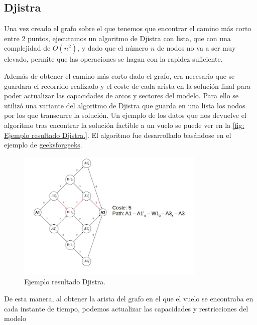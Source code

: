 \subsection{Djistra}
Una vez creado el grafo sobre el que tenemos que encontrar el camino más corto entre 2 puntos, ejecutamos un algoritmo de Djistra con lista, que con una complejidad de $O(n^{2})$, y dado que el número $n$ de nodos no va a ser muy elevado, permite que las operaciones se hagan con la rapidez suficiente.

Además de obtener el camino más corto dado el grafo, era necesario que se guardara el recorrido realizado y el coste de cada arista en la solución final para poder actualizar las capacidades de arcos y sectores del modelo. Para ello se utilizó una variante del algoritmo de Djistra que guarda en una lista los nodos por los que transcurre la solución. Un ejemplo de los datos que nos devuelve el algoritmo tras encontrar la solución factible a un vuelo se puede ver en la \autoref{fig: Ejemplo resultado Djistra.}. El algoritmo fue desarrollado basándose en el ejemplo de \href{http://www.geeksforgeeks.org/printing-paths-dijkstras-shortest-path-algorithm/}{geeksforgeeks}.

\begin{figure}[]
	\begin{center}
		\centering
		\includegraphics[width=0.8\textwidth]{./imagenes/heuristico/recorrido.jpg}
			\caption{Ejemplo resultado Djistra.}
			\label{fig: Ejemplo resultado Djistra.}
	\end{center}
\end{figure}

De esta manera, al obtener la arista del grafo en el que el vuelo se encontraba en cada instante de tiempo, podemos actualizar las capacidades y restricciones del modelo

